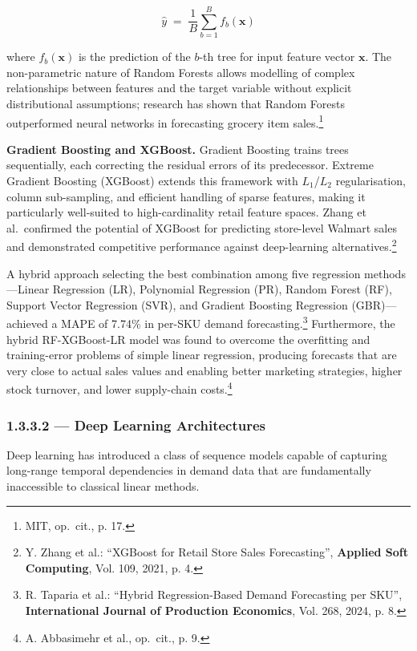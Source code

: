 \begin{equation}
  \hat{y} \;=\; \frac{1}{B}\sum_{b=1}^{B} f_b(\mathbf{x})
  \label{eq:rf}
\end{equation}

\noindent where $f_b(\mathbf{x})$ is the prediction of the $b$-th tree for
input feature vector $\mathbf{x}$. The non-parametric nature of Random
Forests allows modelling of complex relationships between features and the
target variable without explicit distributional assumptions; research has
shown that Random Forests outperformed neural networks in forecasting grocery
item sales.\footnote{MIT, op.\ cit., p. 17.}

\medskip
\noindent\textbf{Gradient Boosting and XGBoost.}
Gradient Boosting trains trees sequentially, each correcting the residual
errors of its predecessor. Extreme Gradient Boosting (XGBoost) extends this
framework with $L_1$/$L_2$ regularisation, column sub-sampling, and
efficient handling of sparse features, making it particularly well-suited to
high-cardinality retail feature spaces. Zhang et al.\ confirmed the potential
of XGBoost for predicting store-level Walmart sales and demonstrated
competitive performance against deep-learning
alternatives.\footnote{Y. Zhang et al.: ``XGBoost for Retail Store Sales
Forecasting'', \textbf{Applied Soft Computing}, Vol. 109, 2021, p. 4.}

A hybrid approach selecting the best combination among five regression
methods—Linear Regression (LR), Polynomial Regression (PR), Random Forest
(RF), Support Vector Regression (SVR), and Gradient Boosting Regression
(GBR)—achieved a MAPE of 7.74\% in per-SKU demand
forecasting.\footnote{R. Taparia et al.: ``Hybrid Regression-Based Demand
Forecasting per SKU'', \textbf{International Journal of Production
Economics}, Vol. 268, 2024, p. 8.} Furthermore, the hybrid RF-XGBoost-LR
model was found to overcome the overfitting and training-error problems of
simple linear regression, producing forecasts that are very close to
actual sales values and enabling better marketing strategies, higher stock
turnover, and lower supply-chain costs.\footnote{A. Abbasimehr et al.,
op.\ cit., p. 9.}

\subsubsection{1.3.3.2 — Deep Learning Architectures}

Deep learning has introduced a class of sequence models capable of capturing
long-range temporal dependencies in demand data that are fundamentally
inaccessible to classical linear methods.

